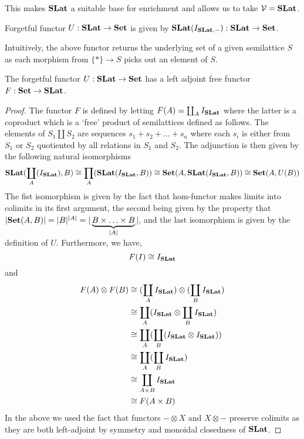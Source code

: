   This makes $\mathbf{SLat}$ a suitable base for enrichment and allows us to take $\mathcal{V} = \mathbf{SLat}$.

  \begin{definition}
    Forgetful functor $U : \mathbf{SLat} \to \mathbf{Set}$ is given by $\mathbf{SLat}(I_{\mathbf{SLat}, -}) : \mathbf{SLat} \to \mathbf{Set}$.
    \end{definition}
    
    Intuitively, the above functor returns the underlying set of a given semilattice $S$ as each morphism from $\{*\} \to S$ picks out an element of $S$.
    
    \begin{proposition}
      The forgetful functor $U : \mathbf{SLat} \to \mathbf{Set}$ has a left adjoint free functor $F : \mathbf{Set} \to \mathbf{SLat}$.
    \end{proposition}
    \begin{proof}
      The functor $F$ is defined by letting $F(A) = \coprod_{A} I_{\mathbf{SLat}}$ where the latter is a coproduct which is a `free' product of semilattices defined as follows.
      The elements of $S_{1} \coprod S_{2}$ are sequences $s_{1} + s_{2} + \ldots + s_{n}$ where each $s_{i}$ is either from $S_{1}$ or $S_{2}$ quotiented by all relations in $S_{1}$ and $S_{2}$.
      The adjunction is then given by the following natural isomorphisms
      \[
      \mathbf{SLat}(\coprod_{A}(I_{\mathbf{SLat}}), B) \cong \prod_{A}(\mathbf{SLat}(I_{\mathbf{SLat}}, B)) \cong \mathbf{Set}(A,\mathbf{SLat}(I_{\mathbf{SLat}}, B)) \cong \mathbf{Set}(A, U(B))
      \]
      The fist isomorphism is given by the fact that hom-functor makes limits into colimits in its first argument, the second being given by the property that $|\mathbf{Set}(A,B)| = |B|^{|A|} = |\underbrace{B \times \ldots \times B}_{|A|}|$, and the last isomorphism is given by the definition of $U$.
      Furthermore, we have, 
      \[
      F(I) \cong I_{\mathbf{SLat}}
      \]
      and 
      \begin{align*}
      F(A) \otimes F(B) &\cong (\coprod_{A} I_{\mathbf{SLat}}) \otimes (\coprod_{B} I_{\mathbf{SLat}})\\
            &\cong \coprod_{A} (I_{\mathbf{SLat}} \otimes \coprod_{B} I_{\mathbf{SLat}})\\
            &\cong \coprod_{A} (\coprod_{B} (I_{\mathbf{SLat}} \otimes I_{\mathbf{SLat}}))\\
            &\cong \coprod_{A} (\coprod_{B} I_{\mathbf{SLat}})\\
            &\cong \coprod_{A \times B} I_{\mathbf{SLat}}\\
            &\cong F(A \times B)
      \end{align*}
    In the above we used the fact that functors $- \otimes X$ and $X \otimes -$ preserve colimits as they are both left-adjoint by symmetry and monoidal closedness of $\mathbf{SLat}$.
    \end{proof}

